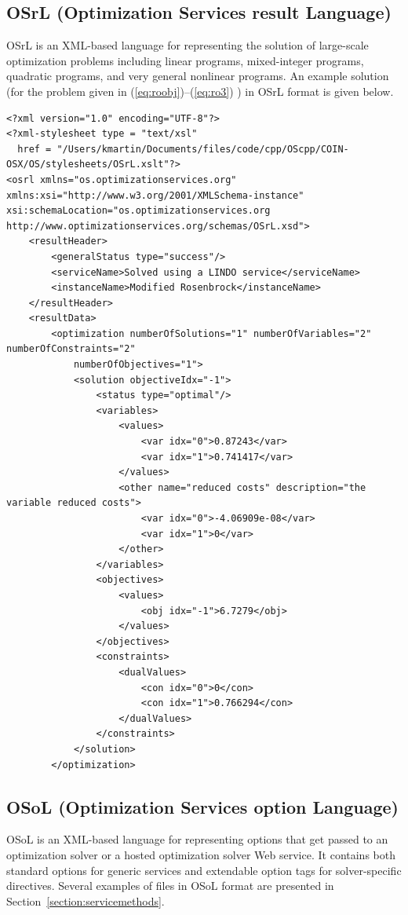 \documentclass[11pt]{article}
\renewcommand{\_}{{\char"5F}}
\renewcommand{\{}{{\char"7B}}
\renewcommand{\}}{{\char"7D}}
\renewcommand{\^}{{\char"0D}}
\renewcommand{\'}{{\char"0D}}
\begin{document}
\begin{enumerate}[Step 1:]
\subsection{OSrL (Optimization Services result Language)} \label{section:osrlschema}
OSrL is an XML-based language for representing the solution of large-scale
optimization problems including linear programs, mixed-integer programs,
quadratic programs, and very general nonlinear programs.  An example solution (for the problem given in
 (\ref{eq:roobj})--(\ref{eq:ro3}) ) in OSrL format is given below.

{\small
\begin{verbatim}
<?xml version="1.0" encoding="UTF-8"?>
<?xml-stylesheet type = "text/xsl"
  href = "/Users/kmartin/Documents/files/code/cpp/OScpp/COIN-OSX/OS/stylesheets/OSrL.xslt"?>
<osrl xmlns="os.optimizationservices.org"
xmlns:xsi="http://www.w3.org/2001/XMLSchema-instance"
xsi:schemaLocation="os.optimizationservices.org
http://www.optimizationservices.org/schemas/OSrL.xsd">
    <resultHeader>
        <generalStatus type="success"/>
        <serviceName>Solved using a LINDO service</serviceName>
        <instanceName>Modified Rosenbrock</instanceName>
    </resultHeader>
    <resultData>
        <optimization numberOfSolutions="1" numberOfVariables="2" numberOfConstraints="2"
            numberOfObjectives="1">
            <solution objectiveIdx="-1">
                <status type="optimal"/>
                <variables>
                    <values>
                        <var idx="0">0.87243</var>
                        <var idx="1">0.741417</var>
                    </values>
                    <other name="reduced costs" description="the variable reduced costs">
                        <var idx="0">-4.06909e-08</var>
                        <var idx="1">0</var>
                    </other>
                </variables>
                <objectives>
                    <values>
                        <obj idx="-1">6.7279</obj>
                    </values>
                </objectives>
                <constraints>
                    <dualValues>
                        <con idx="0">0</con>
                        <con idx="1">0.766294</con>
                    </dualValues>
                </constraints>
            </solution>
        </optimization>
\end{verbatim}
}



\subsection{OSoL (Optimization Services option Language)} \label{section:osolschema}
OSoL is
an XML-based language for representing options that get passed to an optimization solver or a hosted optimization
solver Web service. It contains both standard options for generic services and extendable option tags for
solver-specific directives.
Several examples of files in OSoL format are presented in Section~\ref{section:servicemethods}.%


\end{enumerate}
\end{document}
